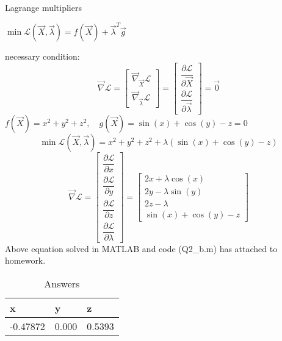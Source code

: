 Lagrange multipliers


$\min \mathcal{L}(\vec{X}, \vec{\lambda}) = f(\vec{X}) +\vec{\lambda}^T \vec{g}$

necessary condition:
$$\vec{\nabla} \mathcal{L}  =  \begin{bmatrix}
	 \vec{\nabla}_{\vec{X}} \mathcal{L} \\[6pt]
	 \vec{\nabla}_{\vec{\lambda}} \mathcal{L}
\end{bmatrix} = \begin{bmatrix}
\dfrac{\partial \mathcal{L}}{\partial \vec{X}} \\[10pt]
\dfrac{\partial \mathcal{L}}{\partial \vec{\lambda}}
\end{bmatrix} = \vec{0}$$
$f(\vec{X}) = x^2 + y^2 + z^2, \quad  g(\vec{X}) = \sin(x) + \cos(y) - z = 0$
$$\min \mathcal{L}(\vec{X}, \vec{\lambda}) = x^2 + y^2 + z^2 + \lambda (\sin(x) + \cos(y) - z)$$
$$\vec{\nabla} \mathcal{L} = \begin{bmatrix}
	\dfrac{\partial \mathcal{L}}{\partial x} \\[10pt]
	\dfrac{\partial \mathcal{L}}{\partial y} \\[10pt]
	\dfrac{\partial \mathcal{L}}{\partial z} \\[10pt]
	\dfrac{\partial \mathcal{L}}{\partial \lambda}
\end{bmatrix}  = \begin{bmatrix}
2x + \lambda\cos(x) \\
2y - \lambda\sin(y) \\
2z - \lambda \\
\sin(x) + \cos(y) -z
\end{bmatrix}$$
Above equation solved in MATLAB and code (Q2\_b.m) has attached to homework.
\begin{table}[H]
	\caption {Answers} \label{ans} 
	\begin{center}
		\begin{tabular}{| l | l | l |}
			\hline
			  x & y & z \TBstrut \\
			  \hline
			-0.47872 & 0.000 & 0.5393 \Tstrut\\
			\hline
		\end{tabular}
	\end{center}
\end{table}
